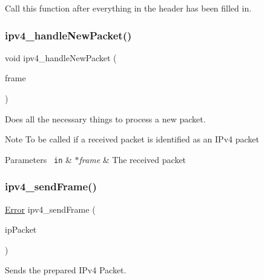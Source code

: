 Call this function after everything in the header has been filled in. 

\mbox{\label{group__ip_ga5de57cac56575029b85390fc8ac1b8ca}} 
\subsubsection{\texorpdfstring{ipv4\_handleNewPacket()}{ipv4\_handleNewPacket()}}
{\footnotesize\ttfamily void ipv4\+\_\+handle\+New\+Packet (\begin{DoxyParamCaption}\item[{\mbox{\hyperlink{ethernet_types_8h_a4ebb2d31f9c7739f76b97c8ee0a7b702}{Ethernet\+Frame}} $\ast$}]{frame }\end{DoxyParamCaption})}



Does all the necessary things to process a new packet. 

\begin{DoxyNote}{Note}
To be called if a received packet is identified as an I\+Pv4 packet 
\end{DoxyNote}

\begin{DoxyParams}[1]{Parameters}
\mbox{\texttt{ in}}  & {\em $\ast$frame} & The received packet \\
\hline
\end{DoxyParams}
\mbox{\label{group__ip_ga8bd7900cb9a8af580a2fe0fbb9f559d2}} 
\subsubsection{\texorpdfstring{ipv4\_sendFrame()}{ipv4\_sendFrame()}}
{\footnotesize\ttfamily \mbox{\hyperlink{error_8h_ada9d6bcf34dabaf048e197cb7b69fa6a}{Error}} ipv4\+\_\+send\+Frame (\begin{DoxyParamCaption}\item[{\mbox{\hyperlink{ipv4_types_8h_a1a3db8172a6bdf4bb1957929ca11710c}{I\+Pv4\+Packet}}}]{ip\+Packet }\end{DoxyParamCaption})}



Sends the prepared I\+Pv4 Packet. 


